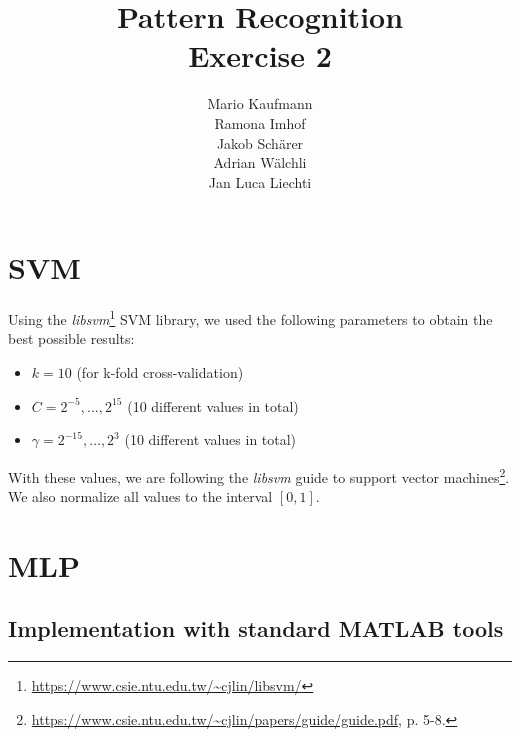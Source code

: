 \documentclass[a4paper]{article}
\title{Pattern Recognition\\Exercise 2}
\author{Mario Kaufmann \\ Ramona Imhof \\ Jakob Sch\"arer \\ Adrian W\"alchli \\ Jan Luca Liechti}
\begin{document}
\maketitle

\section{SVM}
Using the \textit{libsvm}\footnote{\url{https://www.csie.ntu.edu.tw/~cjlin/libsvm/}} SVM library, we used the following parameters to obtain the best possible results:
\begin{itemize}
\item $k = 10$ (for k-fold cross-validation)
\item $C = 2^{-5}, \ldots, 2^{15}$ (10 different values in total)
\item $\gamma = 2^{-15}, \ldots, 2^{3}$ (10 different values in total)
\end{itemize}
With these values, we are following the \textit{libsvm} guide to support vector machines\footnote{\url{https://www.csie.ntu.edu.tw/~cjlin/papers/guide/guide.pdf}, p. 5-8.}. We also normalize all values to the interval $[0,1]$.

\section{MLP}

\subsection{Implementation with standard MATLAB tools}
\end{document}

